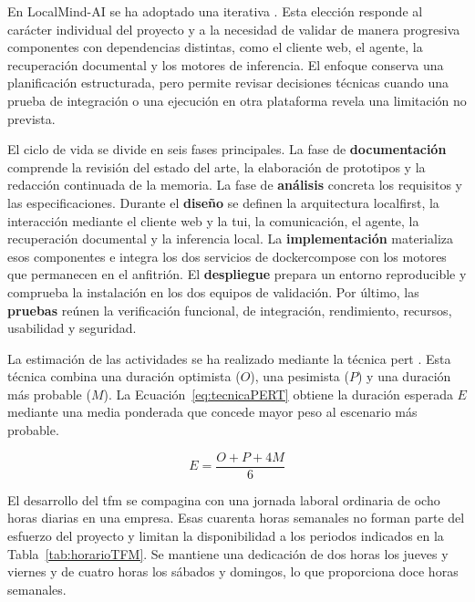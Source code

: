 En LocalMind-AI se ha adoptado una \gls{iterativa} \cite{larmanIterativeIncrementalDevelopments2003}. Esta elección responde al carácter individual del proyecto y a la necesidad de validar de manera progresiva componentes con dependencias distintas, como el cliente web, el agente, la recuperación documental y los motores de inferencia. El enfoque conserva una planificación estructurada, pero permite revisar decisiones técnicas cuando una prueba de integración o una ejecución en otra plataforma revela una limitación no prevista.

El ciclo de vida se divide en seis fases principales. La fase de \textbf{documentación} comprende la revisión del estado del arte, la elaboración de prototipos y la redacción continuada de la memoria. La fase de \textbf{análisis} concreta los requisitos y las especificaciones. Durante el \textbf{diseño} se definen la arquitectura \gls{localfirst}, la interacción mediante el cliente web y la \gls{tui}, la comunicación, el agente, la recuperación documental y la inferencia local. La \textbf{implementación} materializa esos componentes e integra los dos servicios de \gls{dockercompose} con los motores que permanecen en el anfitrión. El \textbf{despliegue} prepara un entorno reproducible y comprueba la instalación en los dos equipos de validación. Por último, las \textbf{pruebas} reúnen la verificación funcional, de integración, rendimiento, recursos, usabilidad y seguridad.

La estimación de las actividades se ha realizado mediante la técnica \gls{pert} \cite{mazlumCPMPERTProject2015}. Esta técnica combina una duración optimista (\(O\)), una pesimista (\(P\)) y una duración más probable (\(M\)). La Ecuación~\ref{eq:tecnicaPERT} obtiene la duración esperada \(E\) mediante una media ponderada que concede mayor peso al escenario más probable.

\begin{equation}
    E = \frac{O + P + 4M}{6}
    \label{eq:tecnicaPERT}
\end{equation}

El desarrollo del \gls{tfm} se compagina con una jornada laboral ordinaria de ocho horas diarias en una empresa. Esas cuarenta horas semanales no forman parte del esfuerzo del proyecto y limitan la disponibilidad a los periodos indicados en la Tabla~\ref{tab:horarioTFM}. Se mantiene una dedicación de dos horas los jueves y viernes y de cuatro horas los sábados y domingos, lo que proporciona doce horas semanales.

